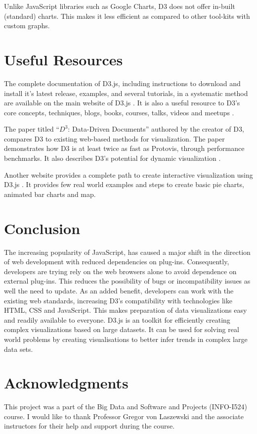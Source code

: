 \documentclass[9pt,twocolumn,twoside]{../../styles/osajnl}
\begin{document}
Unlike JavaScript libraries such as Google Charts, D3 does not offer in-built (standard) charts. This makes it less efficient as compared to other tool-kits with custom graphs.

\section{Useful Resources}
The complete documentation of D3.js, including instructions to download and install it's latest release, examples, and several tutorials, in a systematic method are available on the main website of D3.js \cite{www-d3}. It is also a useful resource to D3's core concepts, techniques, blogs, books, courses, talks, videos and meetups \cite{www-tut}. 

The paper titled “$D^3$: Data-Driven Documents” authored by the creator of D3, compares D3 to existing web-based methods for visualization. The paper demonstrates how D3 is at least twice as fast as Protovis, through performance benchmarks. It also describes D3’s potential for dynamic visualization \cite{paper-d3}.

Another website provides a complete path to create interactive visualization using D3.js \cite{www-av}. It provides few real world examples and steps to create basic pie charts, animated bar charts and map.

\section{Conclusion}
The increasing popularity of JavaScript, has caused a major shift in the direction of web development with reduced dependencies on plug-ins. Consequently, developers are trying rely on the web browsers alone to avoid dependence on external plug-ins. This reduces the possibility of bugs or incompatibility issues as well the need to update. As an added benefit, developers can work with the existing web standards, increasing D3’s compatibility with technologies like HTML, CSS and JavaScript. This makes preparation of data visualizations easy and readily available to everyone. D3.js is an toolkit for efficiently creating complex visualizations based on large datasets. It can be used for solving real world problems by creating visualisations to better infer trends in complex large data sets.

\section{Acknowledgments}
This project was a part of the Big Data and Software and Projects (INFO-I524) course. I would like to thank Professor Gregor von Laszewski and the associate instructors for their help and support during the course. 


\end{document}
